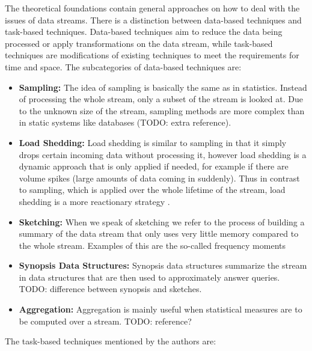 The theoretical foundations contain general approaches on how to deal with the issues of data streams. There is a distinction between data-based techniques and task-based techniques. Data-based techniques aim to reduce the data being processed or apply transformations on the data stream, while task-based techniques are modifications of existing techniques to meet the requirements for time and space. The subcategories of data-based techniques are:

\begin{itemize}
	\item \textbf{Sampling:} The idea of sampling is basically the same as in statistics. Instead of processing the whole stream, only a subset of the stream is looked at. Due to the unknown size of the stream, sampling methods are more complex than in static systems like databases (TODO: extra reference). 
	\item \textbf{Load Shedding:} Load shedding is similar to sampling in that it simply drops certain incoming data without processing it, however load shedding is a dynamic approach that is only applied if needed, for example if there are volume spikes (large amounts of data coming in suddenly). Thus in contrast to sampling, which is applied over the whole lifetime of the stream, load shedding is a more reactionary strategy \cite{babcock2003load}.
	\item \textbf{Sketching:} When we speak of sketching we refer to the process of building a summary of the data stream that only uses very little memory compared to the whole stream. Examples of this are the so-called frequency moments \cite{babcock2002models}
	\item \textbf{Synopsis Data Structures:} Synopsis data structures summarize the stream in data structures that are then used to approximately answer queries. TODO: difference between synopsis and sketches.
	\item \textbf{Aggregation:} Aggregation is mainly useful when statistical measures are to be computed over a stream. TODO: reference?
\end{itemize}

The task-based techniques mentioned by the authors are:

